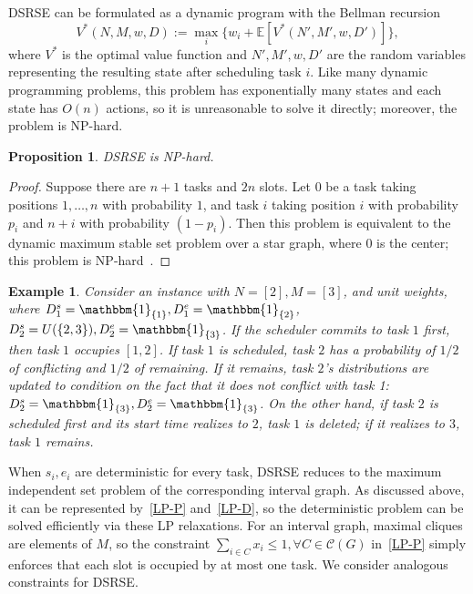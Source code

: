 \documentclass[final,5p,times,twocolumn]{elsarticle}
\newtheorem{example}[theorem]{Example}
\newtheorem{proposition}[theorem]{Proposition}
\newcommand{\E}{\mathbb{E}}
\begin{document}
DSRSE can be formulated as a dynamic program with the Bellman recursion
\[
V^*(N,M,w,D):=\max_i\{w_i+\E[V^*(N',M',w,D')]\},
\]
where %
$V^*$ is the optimal value function and $N',M',w,D'$ are the random variables representing the resulting state after scheduling task $i$.
Like many dynamic programming problems, this problem has exponentially many states and each state has $O(n)$ actions, so it is unreasonable to solve it directly;
moreover, the problem is NP-hard.
\begin{proposition}
    DSRSE is NP-hard.
\end{proposition}
\begin{proof}
    Suppose there are $n+1$ tasks and $2n$ slots.
    Let $0$ be a task taking positions $1,\ldots,n$ with probability $1$, and task $i$ taking position $i$ with probability $p_i$ and $n+i$ with probability $(1-p_i)$.
    Then this problem is equivalent to the dynamic maximum stable set problem over a star graph, where $0$ is the center;
    this problem is NP-hard~\cite{DNP}.
\end{proof}
\begin{example}
\label{eg:1}
    Consider an instance with $N=[2],M=[3]$, and unit weights, where $D_1^s=\mathbbm{1}_{\{1\}},D_1^e=\mathbbm{1}_{\{2\}}$, $D_2^s=U(\{2,3\}),D_2^e=\mathbbm{1}_{\{3\}}$.
If the scheduler commits to task $1$ first, then task $1$ occupies $[1,2]$.
%
If task $1$ is scheduled, task $2$ has a probability of $1/2$ of conflicting and $1/2$ of remaining.
If it remains, task $2$'s distributions are updated to condition on the fact that it does not conflict with task 1: $D_2^s=\mathbbm{1}_{\{3\}},D_2^e=\mathbbm{1}_{\{3\}}$.
On the other hand, if task $2$ is scheduled first and its start time realizes to $2$, task $1$ is deleted; if it realizes to $3$, task $1$ remains.
\end{example}
When $s_i,e_i$ are deterministic for every task, DSRSE reduces to the maximum independent set problem of the corresponding interval graph.
As discussed above, it can be represented by~\eqref{LP-P} and~\eqref{LP-D}, so the deterministic problem can be solved efficiently via these LP relaxations.
For an interval graph, maximal cliques are elements of $M$, so the constraint $\sum_{i\in C}x_i\leq 1,\forall C\in\mathcal{C}(G)$ in~\eqref{LP-P} simply enforces that each slot is occupied by at most one task.
We consider analogous constraints for DSRSE.
\end{document}

